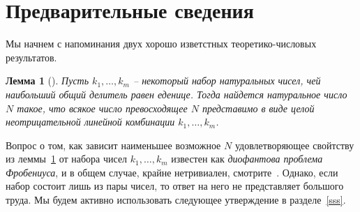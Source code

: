 \documentclass[11pt]{article}
\newcommand{\sa}{synchronizing automata}
\newtheorem{lemma}{Лемма}
\begin{document}

\section{Предварительные сведения}
\label{preliminaries}

Мы начнем с напоминания двух хорошо изветстных теоретико-числовых результатов.


\begin{lemma}[{\mdseries\cite[Теорема 1.0.1]{RaAl05}}]
\label{schur}
Пусть $k_1,\dots,k_m$ -- некоторый набор натуральных чисел, чей наибольший общий
делитель равен еденице. Тогда найдется натуральное число $N$ такое, что всякое число
превосходящее $N$ представимо в виде целой неотрицательной линейной комбинации
$k_1,\dots,k_m$.
\end{lemma}


Вопрос о том, как зависит наименьшее возможное $N$ удовлетворяющее свойтству из леммы~\ref{schur}
от набора чисел $k_1,\dots,k_m$ известен как \emph{диофантова проблема Фробениуса},
и в общем случае, крайне нетривиален, смотрите~\cite{RaAl05}. Однако, если набор состоит
лишь из пары чисел, то ответ на него не представляет большого труда. Мы будем активно использовать
следующее утверждение в разделе~\ref{sss}.
\end{document}
